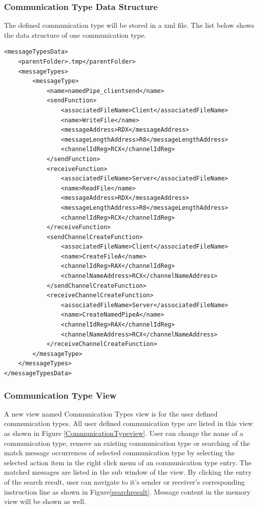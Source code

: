 \documentclass[paper=a4, fontsize=11pt]{scrartcl}
\numberwithin{equation}{section}		%
\numberwithin{figure}{section}			%
\numberwithin{table}{section}				%
\begin{document}
\subsubsection{Communication Type Data Structure}
The defined communication type will be stored in a xml file. The list below shows the data structure of one communication type. 
\begin{lstlisting}
<messageTypesData>
    <parentFolder>.tmp</parentFolder>
    <messageTypes>
        <messageType>
            <name>namedPipe_clientsend</name>
            <sendFunction>
                <associatedFileName>Client</associatedFileName>
                <name>WriteFile</name>
                <messageAddress>RDX</messageAddress>
                <messageLengthAddress>R8</messageLengthAddress>
                <channelIdReg>RCX</channelIdReg>
            </sendFunction>
            <receiveFunction>
                <associatedFileName>Server</associatedFileName>
                <name>ReadFile</name>
                <messageAddress>RDX</messageAddress>
                <messageLengthAddress>R8</messageLengthAddress>
                <channelIdReg>RCX</channelIdReg>
            </receiveFunction>
            <sendChannelCreateFunction>
                <associatedFileName>Client</associatedFileName>
                <name>CreateFileA</name>
                <channelIdReg>RAX</channelIdReg>
                <channelNameAddress>RCX</channelNameAddress>
            </sendChannelCreateFunction>
            <receiveChannelCreateFunction>
                <associatedFileName>Server</associatedFileName>
                <name>CreateNamedPipeA</name>
                <channelIdReg>RAX</channelIdReg>
                <channelNameAddress>RCX</channelNameAddress>
            </receiveChannelCreateFunction>
        </messageType>
    </messageTypes>
</messageTypesData>
\end{lstlisting}


\subsubsection{Communication Type View}
A new view named Communication Types view is for the user defined communication types. All user defined communication type are listed in this view  as shown in Figure \ref{CommunicationTypeview}. User can change the name of a communication type, remove an existing communication type or searching of the match message occurrences of selected communication type by selecting the selected action item in the right click menu of an communication type entry. The matched messages are listed in the sub window of the view. By clicking the entry of the search  result, user can navigate to it's sender or receiver's corresponding instruction line as shown in Figure\ref{searchresult}. Message content in the memory view will be shown as well.
\end{document}
